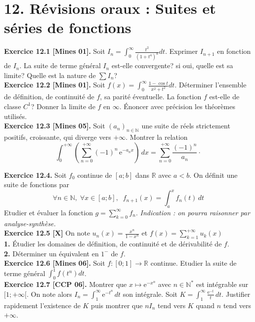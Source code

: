 \documentclass[a4paper,12pt,francais]{article}
\newcommand{\field}[1]{\mathbb{#1}}
\newcommand{\N}{\field{N}}
\newcommand{\R}{\field{R}}
\newcommand{\e}{\mbox{e}}
\begin{document}
\newpage
\section*{12. Révisions oraux : Suites et séries de fonctions} %


\noindent
{\bf Exercice 12.1 [Mines 01].} Soit $I_n=\int_0^\infty
\frac{t^2}{(1+t^4)^n} dt$. Exprimer $I_{n+1}$ en fonction de $I_n$. La
suite de terme général $I_n$ est-elle convergente? si oui, quelle est
sa limite? Quelle est la nature de $\sum I_n$?\\

\noindent
{\bf Exercice 12.2 [Mines 01].} Soit $\displaystyle f(x)=\int_0^\infty \frac{1-\cos
  t}{x^2+t^2} dt.$
Déterminer l'ensemble de définition, de continuité de $f$, sa parité éventuelle. La fonction
  $f$ est-elle de classe $C^1$? Donner la limite de $f$ en
  $\infty$. \'Enoncer avec précision les théorèmes utilisés.\\

\noindent
{\bf Exercice 12.3 [Mines 05].} Soit $(a_n)_{n\in \N}$ une suite de réels strictement positifs, croissante, qui diverge vers $+\infty$. Montrer la relation
$$\displaystyle 
\int_0^{+\infty}
\left({
\sum_{n=0}^{+\infty} (-1)^n \, \e^{-a_n x} }\right)\, dx =
\sum_{n=0}^{+\infty}\frac{(-1)^n}{a_n} \cdot$$

\noindent
{\bf Exercice 12.4.} Soit $f_0$ continue de $[a;b]$ dans
$\R$ avec $a<b$. On définit une suite de fonctions par 
$$\forall n\in \N, \; \forall x \in [a;b],\; \; f_{n+1}(x)=\int_a^x f_n(t)\,dt$$
Etudier et évaluer la fonction $\displaystyle g=\sum_{k=0}^\infty
f_n$. 
{\it Indication : on pourra raisonner par analyse-synthèse.}\\

\noindent
{\bf Exercice 12.5 [X]} On note $\displaystyle u_n(x)=\frac{x^n}{1-x^n}$ et
$\displaystyle f(x)=\sum_{k=1}^{+\infty} u_k(x)$\\
{\bf 1.} \'Etudier les domaines de définition, de continuité et de
dérivabilité de $f$.\\
{\bf 2.} Déterminer un équivalent en $1^-$ de $f$.\\

\noindent
{\bf Exercice 12.6 [Mines 06].} Soit $f:[0;1] \to \R$
continue. Etudier la suite de terme général $\int_0^1 f(t^n) dt$.\\

\noindent
{\bf Exercice 12.7 [CCP 06].} Montrer que $x\mapsto \e^{-x^n}$ avec $n
\in \N^*$ est intégrable sur $[1;+\infty[$. On note alors
    $\displaystyle I_n=\int_1^\infty \e^{-t^n} \, dt$ son intégrale. 
Soit $\displaystyle K=\int_1^\infty \frac{\e^{-t}}{t} \, dt$. Justifier
rapidement l'existence de $K$ puis montrer que $nI_n$ tend vers $K$ quand $n$
tend vers $+\infty$.\\
\end{document}
